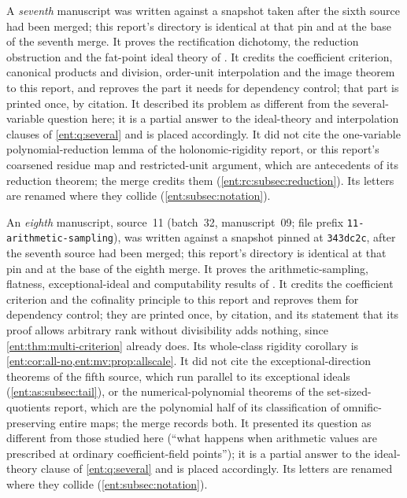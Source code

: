 \documentclass[11pt]{article}
\theoremstyle{plain}
\theoremstyle{plain}
\theoremstyle{plain}
\theoremstyle{definition}
\theoremstyle{definition}
\theoremstyle{definition}
\theoremstyle{definition}
\theoremstyle{remark}
\begin{document}
A \emph{seventh} manuscript was written against a snapshot taken after the
sixth source had been merged; this report's directory is identical at that
pin and at the base of the seventh merge. It proves the rectification
dichotomy, the reduction obstruction and the fat-point ideal theory of
. It credits the
coefficient criterion, canonical products and division, order-unit
interpolation and the image theorem to this report, and reproves the part it
needs for dependency control; that part is printed once, by citation. It
described its problem as different from the several-variable question here;
it is a partial answer to the ideal-theory and interpolation clauses of
\cref{ent:q:several} and is placed accordingly. It did not cite the
one-variable polynomial-reduction lemma of the holonomic-rigidity report, or
this report's coarsened residue map and restricted-unit argument, which are
antecedents of its reduction theorem; the merge credits them
(\cref{ent:rc:subsec:reduction}). Its letters are renamed where they collide
(\cref{ent:subsec:notation}).

An \emph{eighth} manuscript, source~11 (batch~32, manuscript~09; file prefix
\texttt{11-arithmetic-sampling}), was written against a snapshot pinned at
\texttt{343dc2c}, after the seventh source had been merged; this report's
directory is identical at that pin and at the base of the eighth merge. It
proves the arithmetic-sampling, flatness, exceptional-ideal and computability
results of . It
credits the coefficient criterion and the cofinality principle to this report
and reproves them for dependency control; they are printed once, by citation,
and its statement that its proof allows arbitrary rank without divisibility
adds nothing, since \cref{ent:thm:multi-criterion} already does. Its
whole-class rigidity corollary is \cref{ent:cor:all-no,ent:mv:prop:allscale}.
It did not cite the exceptional-direction theorems of the fifth source, which
run parallel to its exceptional ideals (\cref{ent:as:subsec:tail}), or the
numerical-polynomial theorems of the set-sized-quotients report, which are the
polynomial half of its classification of omnific-preserving entire maps; the
merge records both. It presented its question as different from those studied
here (``what happens when arithmetic values are prescribed at ordinary
coefficient-field points''); it is a partial answer to the ideal-theory clause
of \cref{ent:q:several} and is placed accordingly. Its letters are renamed
where they collide (\cref{ent:subsec:notation}).
\end{document}
